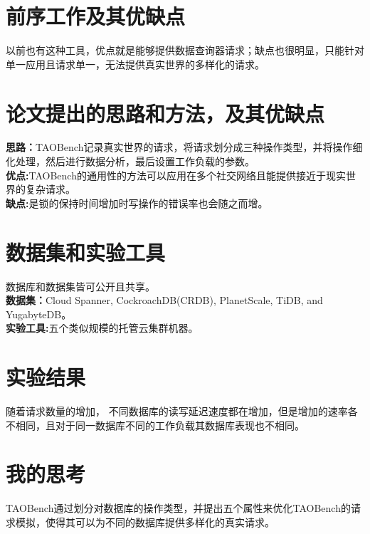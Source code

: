 \documentclass[a4paper]{article}
\begin{document}
\section{前序工作及其优缺点}
以前也有这种工具，优点就是能够提供数据查询器请求；缺点也很明显，只能针对单一应用且请求单一，无法提供真实世界的多样化的请求。
\section{论文提出的思路和方法，及其优缺点}
\textbf{思路：}TAOBench记录真实世界的请求，将请求划分成三种操作类型，并将操作细化处理，然后进行数据分析，最后设置工作负载的参数。\\
\textbf{优点:}TAOBench的通用性的方法可以应用在多个社交网络且能提供接近于现实世界的复杂请求。\\
\textbf{缺点:}是锁的保持时间增加时写操作的错误率也会随之而增。
\section{数据集和实验工具}
数据库和数据集皆可公开且共享。\\
\textbf{数据集：}Cloud Spanner, CockroachDB(CRDB), PlanetScale, TiDB, and YugabyteDB。\\
\textbf{实验工具:}五个类似规模的托管云集群机器。
\section{实验结果}
随着请求数量的增加， 不同数据库的读写延迟速度都在增加，但是增加的速率各不相同，且对于同一数据库不同的工作负载其数据库表现也不相同。
\section{我的思考}
TAOBench通过划分对数据库的操作类型，并提出五个属性来优化TAOBench的请求模拟，使得其可以为不同的数据库提供多样化的真实请求。
\end{document}
